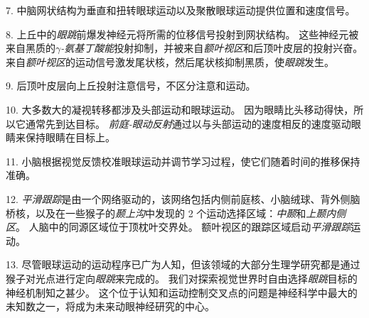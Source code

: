7. 中脑网状结构为垂直和扭转眼球运动以及聚散眼球运动提供位置和速度信号。


8. 上丘中的\textit{眼跳}前爆发神经元将所需的位移信号投射到网状结构。
这些神经元被来自黑质的\textit{$ \gamma $-氨基丁酸能}投射抑制，并被来自\textit{额叶视区}和后顶叶皮层的投射兴奋。
来自\textit{额叶视区}的运动信号激发尾状核，然后尾状核抑制黑质，使\textit{眼跳}发生。


9. 后顶叶皮层向上丘投射注意信号，不区分注意和运动。


10. 大多数大的凝视转移都涉及头部运动和眼球运动。
因为眼睛比头移动得快，所以它通常先到达目标。
\textit{前庭-眼动反射}通过以与头部运动的速度相反的速度驱动眼睛来保持眼睛在目标上。


11. 小脑根据视觉反馈校准眼球运动并调节学习过程，使它们随着时间的推移保持准确。


12. \textit{平滑跟踪}是由一个网络驱动的，该网络包括内侧前庭核、小脑绒球、背外侧脑桥核，以及在一些猴子的\textit{颞上沟}中发现的 2 个运动选择区域：\textit{中颞}和\textit{上颞内侧区}。
人脑中的同源区域位于顶枕叶交界处。
额叶视区的跟踪区域启动\textit{平滑跟踪}运动。


13. 尽管眼球运动的运动程序已广为人知，但该领域的大部分生理学研究都是通过猴子对光点进行定向\textit{眼跳}来完成的。
我们对探索视觉世界时自由选择\textit{眼跳}目标的神经机制知之甚少。
这个位于认知和运动控制交叉点的问题是神经科学中最大的未知数之一，将成为未来动眼神经研究的中心。




